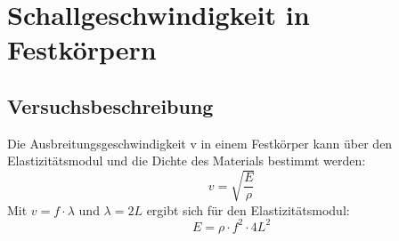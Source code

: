 \documentclass[12pt,a4paper]{article}
\author{Gruppe C14 \\ Julián Häck, Martin Koytek, Lars Wenning, Erik Zimmermann}
\begin{document}
\section{Schallgeschwindigkeit in Festkörpern}
\subsection{Versuchsbeschreibung}
Die Ausbreitungsgeschwindigkeit v in einem Festkörper kann über den Elastizitätsmodul und die Dichte des Materials bestimmt werden:
\begin{equation}
v=\sqrt{\frac{E}{\rho}}
\end{equation}
Mit $v=f\cdot \lambda$ und $\lambda=2L$ ergibt sich für den Elastizitätsmodul:
\begin{equation}
E= \rho\cdot f^2\cdot 4L^2
\end{equation}
\end{document}
